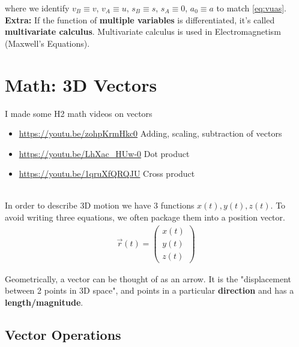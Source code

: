 \documentclass{article}
\begin{document}
where we identify $v_B \equiv v$, $v_A \equiv u$, $s_B \equiv s$, $s_A \equiv 0$, $a_0 \equiv a$ to match \ref{eq:vuas}.
\\
 
\textbf{Extra:} If the function of \textbf{multiple variables} is differentiated, it's called \textbf{multivariate calculus}. Multivariate calculus is used in Electromagnetism (Maxwell's Equations).



\section{Math: 3D Vectors}

I made some H2 math videos on vectors 
\begin{itemize}
    \item \url{https://youtu.be/zohpKrmHkc0} Adding, scaling, subtraction of vectors
    \item \url{https://youtu.be/LhXac_HUw-0} Dot product
    \item \url{https://youtu.be/1qruXfQRQJU} Cross product
\end{itemize}
\leavevmode \\
In order to describe 3D motion we have 3 functions $x(t),y(t),z(t)$. To avoid writing three equations, we often package them into a position vector.
\begin{align}
    \vec{r}(t) = \left(
    \begin{array}{c}  
         x(t) \\
         y(t) \\
         z(t)
    \end{array}
    \right)
\end{align}

Geometrically, a vector can be thought of as an arrow. It is the "displacement between 2 points in 3D space", and points in a particular \textbf{direction} and has a \textbf{length/magnitude}. 

\subsection{Vector Operations}
\end{document}

